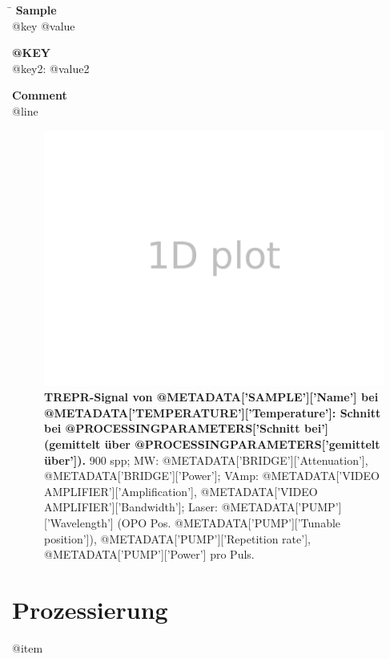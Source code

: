 \documentclass{article}
\begin{document}
\begin{minipage}{\textwidth}
\begin{tabbing}
\hspace{3.5cm} \= \kill
\textbf{Sample}\\
	{@key} \> {@value}\\
\end{tabbing}
\end{minipage}
	
\begin{multicols}{2}

	\begin{minipage}{.49\textwidth}
	\textbf{{@KEY}}\\
		{@key2}: {@value2}\\
	\end{minipage}
\end{multicols}

\begin{minipage}{\textwidth}
\textbf{Comment}\\
	{@line}\\
\end{minipage}





\begin{figure}[H]
	\includegraphics[width=\textwidth]{Plotter1D}
	\caption{\textbf{TREPR-Signal von {@METADATA['SAMPLE']['Name']} bei {@METADATA['TEMPERATURE']['Temperature']}: Schnitt bei {@PROCESSINGPARAMETERS['Schnitt bei']} (gemittelt über {@PROCESSINGPARAMETERS['gemittelt über']}).} 900 spp; MW: {@METADATA['BRIDGE']['Attenuation']}, {@METADATA['BRIDGE']['Power']}; VAmp: {@METADATA['VIDEO AMPLIFIER']['Amplification']}, {@METADATA['VIDEO AMPLIFIER']['Bandwidth']}; Laser: {@METADATA['PUMP']['Wavelength']} (OPO Pos. {@METADATA['PUMP']['Tunable position']}), {@METADATA['PUMP']['Repetition rate']}, {@METADATA['PUMP']['Power']} pro Puls.} 
\end{figure}

\section*{Prozessierung}

	{@item}\\
\end{document}
